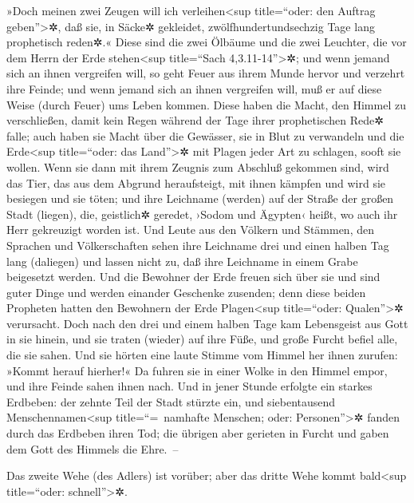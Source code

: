  »Doch meinen zwei Zeugen will ich verleihen\textless sup
title=``oder: den Auftrag geben''\textgreater✲, daß sie, in Säcke✲
gekleidet, zwölfhundertundsechzig Tage lang prophetisch reden✲.«
 Diese sind die zwei Ölbäume und die zwei Leuchter, die
vor dem Herrn der Erde stehen\textless sup title=``Sach
4,3.11-14''\textgreater✲;  und wenn jemand sich an ihnen
vergreifen will, so geht Feuer aus ihrem Munde hervor und verzehrt ihre
Feinde; und wenn jemand sich an ihnen vergreifen will, muß er auf diese
Weise (durch Feuer) ums Leben kommen.  Diese haben die
Macht, den Himmel zu verschließen, damit kein Regen während der Tage
ihrer prophetischen Rede✲ falle; auch haben sie Macht über die Gewässer,
sie in Blut zu verwandeln und die Erde\textless sup title=``oder: das
Land''\textgreater✲ mit Plagen jeder Art zu schlagen, sooft sie wollen.
 Wenn sie dann mit ihrem Zeugnis zum Abschluß gekommen
sind, wird das Tier, das aus dem Abgrund heraufsteigt, mit ihnen kämpfen
und wird sie besiegen und sie töten;  und ihre Leichname
(werden) auf der Straße der großen Stadt (liegen), die, geistlich✲
geredet, ›Sodom und Ägypten‹ heißt, wo auch ihr Herr gekreuzigt worden
ist.  Und Leute aus den Völkern und Stämmen, den Sprachen
und Völkerschaften sehen ihre Leichname drei und einen halben Tag lang
(daliegen) und lassen nicht zu, daß ihre Leichname in einem Grabe
beigesetzt werden.  Und die Bewohner der Erde freuen sich
über sie und sind guter Dinge und werden einander Geschenke zusenden;
denn diese beiden Propheten hatten den Bewohnern der Erde
Plagen\textless sup title=``oder: Qualen''\textgreater✲ verursacht.
 Doch nach den drei und einem halben Tage kam Lebensgeist
aus Gott in sie hinein, und sie traten (wieder) auf ihre Füße, und große
Furcht befiel alle, die sie sahen.  Und sie hörten eine
laute Stimme vom Himmel her ihnen zurufen: »Kommt herauf hierher!« Da
fuhren sie in einer Wolke in den Himmel empor, und ihre Feinde sahen
ihnen nach.  Und in jener Stunde erfolgte ein starkes
Erdbeben: der zehnte Teil der Stadt stürzte ein, und siebentausend
Menschennamen\textless sup title=``=~namhafte Menschen; oder:
Personen''\textgreater✲ fanden durch das Erdbeben ihren Tod; die übrigen
aber gerieten in Furcht und gaben dem Gott des Himmels die Ehre.~--

 Das zweite Wehe (des Adlers) ist vorüber; aber das
dritte Wehe kommt bald\textless sup title=``oder:
schnell''\textgreater✲.

